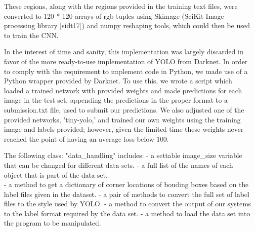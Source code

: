 \documentclass[11pt]{article}
\begin{document}
These regions, along with the regions provided in the training text
files, were converted to 120 * 120 arrays of rgb tuples using Skimage
(SciKit Image processing library {[}sidt17{]}) and numpy reshaping
tools, which could then be used to train the CNN.

In the interest of time and sanity, this implementation was largely
discarded in favor of the more ready-to-use implementation of YOLO from
Darknet. In order to comply with the requirement to implement code in
Python, we made use of a Python wrapper provided by Darknet. To use
this, we wrote a script which loaded a trained network with provided
weights and made predictions for each image in the test set, appending
the predictions in the proper format to a submission.txt file, used to
submit our predictions. We also adjusted one of the provided networks,
'tiny-yolo,' and trained our own weights using the training image and
labels provided; however, given the limited time these weights never
reached the point of having an average loss below 100.

    The following class: "data\_handling" includes: - a settable image\_size
variable that can be changed for different data sets. - a full list of
the names of each object that is part of the data set.\\
- a method to get a dictionary of corner locations of bouding boxes
based on the label files given in the dataset. - a pair of methods to
convert the full set of label files to the style used by YOLO. - a
method to convert the output of our systems to the label format required
by the data set. - a method to load the data set into the program to be
manipulated.
\end{document}
